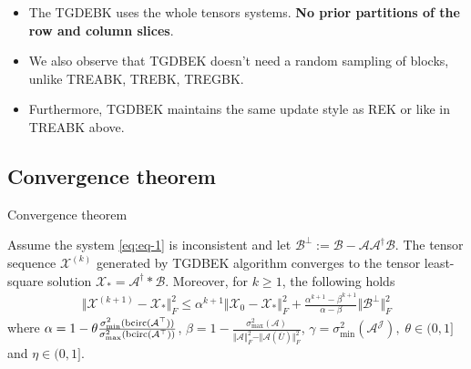 \documentclass[aspectratio=169]{beamer}
\def\bcirc{{\rm bcirc}}
\def\fm#1{\mathcal{#1}}
\def\fm#1{\mathcal{#1}}
\begin{document}
\begin{frame}{}
\begin{itemize}
    \item  The TGDEBK uses the whole tensors systems. \textbf{No prior partitions of the row and column slices}.
    \item We also observe that TGDBEK doesn't need a random sampling of blocks, unlike TREABK, TREBK, TREGBK.
    \item Furthermore, TGDBEK maintains the same update style as  REK or like in TREABK above.  
\end{itemize}
\end{frame}
\subsection{Convergence theorem}
\begin{frame}{Convergence theorem}

\begin{theorem} Assume the system  \eqref{eq:eq-1} is inconsistent and let $\fm B^\perp := \fm B - \fm A \fm A^\dagger \fm B$. The tensor sequence $\fm X^{(k)}$ generated  by TGDBEK algorithm  converges to the  tensor least-square solution $\fm X_\ast = \fm A^\dagger * \fm B$. Moreover, for $k\geq 1$, the following holds
\begin{align}
    \Vert \fm X ^{(k+1)} - \fm X_\ast \Vert_F^2 \leq \alpha^{k+1}\Vert \fm X_0 - \fm X_\ast \Vert_F^2 + \frac{\alpha^{k+1}-\beta^{k+1}}{\alpha - \beta}\Vert \fm B^\perp \Vert_F^2
\end{align}
where $ \alpha = 1 - \theta \frac{\sigma_{\min}^2(\bcirc(\fm A^\top))}{\sigma^2_{\max}(\bcirc(\fm A^\top ))}$, $\beta = 1- \frac{\sigma^2_{\max}(\fm A)}{\Vert \fm A \Vert^2_F - \Vert \fm A(\overline{U}) \Vert_F^2}$, $\gamma = \sigma^2_{\min}(\fm A^{\fm J}), \; \theta \in (0,1]$ and $\eta \in (0, 1]$.
\end{theorem} 
\end{frame}
\end{document}
